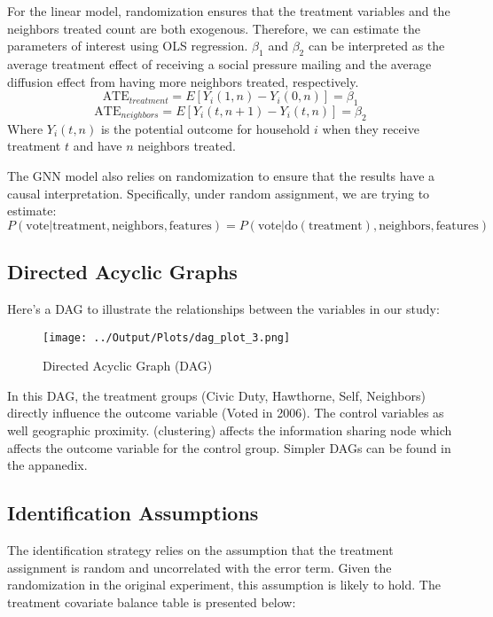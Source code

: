\documentclass[11pt]{article}
\begin{document}
For the linear model, randomization ensures that the treatment variables and the neighbors treated count are both exogenous. Therefore, we can estimate the parameters of interest using OLS regression. $\beta_1$ and $\beta_2$ can be interpreted as the average treatment effect of receiving a social pressure mailing and the average diffusion effect from having more neighbors treated, respectively.
\begin{equation*}
    \text{ATE}_{treatment} = E[Y_i(1, n) - Y_i(0, n)] = \beta_1
\end{equation*}
\begin{equation*}
    \text{ATE}_{neighbors} = E[Y_i(t, n+1) - Y_i(t, n)] = \beta_2
\end{equation*}
Where $Y_i(t, n)$ is the potential outcome for household $i$ when they receive treatment $t$ and have $n$ neighbors treated.

The GNN model also relies on randomization to ensure that the results have a causal interpretation. Specifically, under random assignment, we are trying to estimate:
\begin{equation*}
    P(\text{vote} | \text{treatment}, \text{neighbors}, \text{features}) = P(\text{vote} | \text{do}(\text{treatment}), \text{neighbors}, \text{features})
\end{equation*}

\subsection{Directed Acyclic Graphs}
Here's a DAG to illustrate the relationships between the variables in our study:
\begin{figure}[H]
    \centering
    \texttt{[image: ../Output/Plots/dag\_plot\_3.png]}
    \caption{Directed Acyclic Graph (DAG)}
    \label{fig:dag}
\end{figure}
In this DAG, the treatment groups (Civic Duty, Hawthorne, Self, Neighbors) directly influence the outcome variable (Voted in 2006). The control variables as well geographic proximity. (clustering) affects the information sharing node which affects the outcome variable for the control group. Simpler DAGs can be found in the appanedix.

\subsection{Identification Assumptions}
The identification strategy relies on the assumption that the treatment assignment is random and uncorrelated with the error term. Given the randomization in the original experiment, this assumption is likely to hold. The treatment covariate balance table is presented below:

\end{document}
